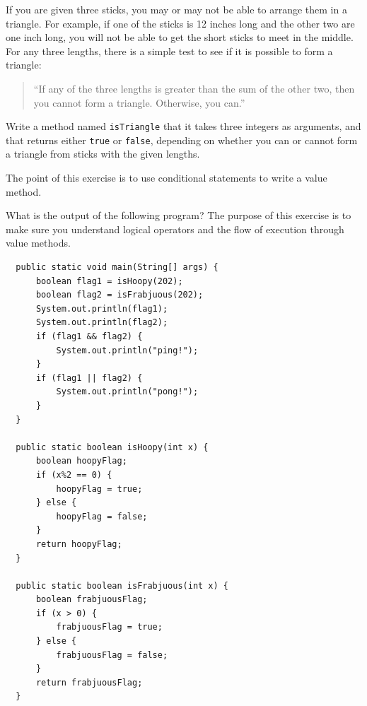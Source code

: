 \begin{exercise}
If you are given three sticks, you may or may not be able to arrange
them in a triangle.  For example, if one of the sticks is 12 inches
long and the other two are one inch long, you will
not be able to get the short sticks to meet in the middle.  For any
three lengths, there is a simple test to see if it is possible to form
a triangle:

\begin{quotation}
``If any of the three lengths is greater than the sum of the other two,
then you cannot form a triangle.  Otherwise, you can.''
\end{quotation}

Write a method named {\tt isTriangle} that it takes three integers as
arguments, and that returns either {\tt true} or {\tt false},
depending on whether you can or cannot form a triangle from sticks
with the given lengths.

The point of this exercise is to use conditional statements to
write a value method.

\end{exercise}


\begin{exercise}
What is the output of the following program?  The purpose of
this exercise is to make sure you understand logical operators
and the flow of execution through value methods.

\begin{lstlisting}
  public static void main(String[] args) {
      boolean flag1 = isHoopy(202);
      boolean flag2 = isFrabjuous(202);
      System.out.println(flag1);
      System.out.println(flag2);
      if (flag1 && flag2) {
          System.out.println("ping!");
      }
      if (flag1 || flag2) {
          System.out.println("pong!");
      }
  }

  public static boolean isHoopy(int x) {
      boolean hoopyFlag;
      if (x%2 == 0) {
          hoopyFlag = true;
      } else {
          hoopyFlag = false;
      }
      return hoopyFlag;
  }

  public static boolean isFrabjuous(int x) {
      boolean frabjuousFlag;
      if (x > 0) {
          frabjuousFlag = true;
      } else {
          frabjuousFlag = false;
      }
      return frabjuousFlag;
  }
\end{lstlisting}
\end{exercise}



